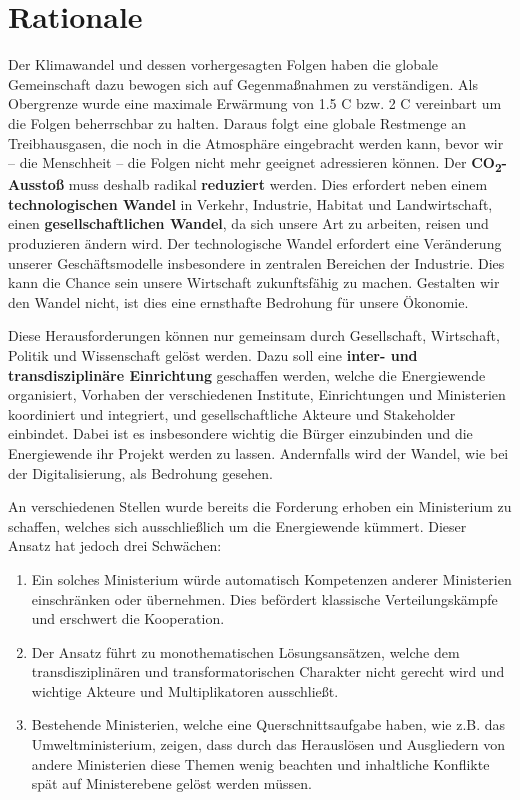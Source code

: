 \section{Rationale}

Der Klimawandel und dessen vorhergesagten Folgen haben die globale Gemeinschaft dazu bewogen sich auf Gegenmaßnahmen zu verständigen. Als Obergrenze wurde eine maximale Erwärmung von 1.5 \degree{}C bzw. 2 \degree{}C vereinbart um die Folgen beherrschbar zu halten.
Daraus folgt eine globale Restmenge an Treibhausgasen, die noch in die Atmosphäre eingebracht werden kann, bevor wir -- die Menschheit -- die Folgen nicht mehr geeignet adressieren können.
%
Der \textbf{CO\textsubscript{2}-Ausstoß} muss deshalb radikal \textbf{reduziert} werden.
Dies erfordert neben einem \textbf{technologischen Wandel} in Verkehr, Industrie, Habitat und Landwirtschaft, einen \textbf{gesellschaftlichen Wandel}, da sich unsere Art zu arbeiten, reisen und produzieren ändern wird.
Der technologische Wandel erfordert eine Veränderung unserer Geschäftsmodelle insbesondere in zentralen Bereichen der Industrie.
Dies kann die Chance sein unsere Wirtschaft zukunftsfähig zu machen.
Gestalten wir den Wandel nicht, ist dies eine ernsthafte Bedrohung für unsere Ökonomie.

Diese Herausforderungen können nur gemeinsam durch Gesellschaft, Wirtschaft, Politik und Wissenschaft gelöst werden.
Dazu soll eine \textbf{inter- und transdisziplinäre Einrichtung} geschaffen werden, welche die Energiewende organisiert, Vorhaben der verschiedenen Institute, Einrichtungen und Ministerien koordiniert und integriert, und gesellschaftliche Akteure und Stakeholder einbindet.
Dabei ist es insbesondere wichtig die Bürger einzubinden und die Energiewende ihr Projekt werden zu lassen.
Andernfalls wird der Wandel, wie bei der Digitalisierung, als Bedrohung gesehen.

An verschiedenen Stellen wurde bereits die Forderung erhoben ein Ministerium zu schaffen, welches sich ausschließlich um die Energiewende kümmert.
Dieser Ansatz hat jedoch drei Schwächen:
\begin{enumerate}
\item Ein solches Ministerium würde automatisch Kompetenzen anderer Ministerien einschränken oder übernehmen. Dies befördert klassische Verteilungskämpfe und erschwert die Kooperation.

\item Der Ansatz führt zu monothematischen Lösungsansätzen, welche dem transdisziplinären und transformatorischen Charakter nicht gerecht wird und wichtige Akteure und Multiplikatoren ausschließt.

\item Bestehende Ministerien, welche eine Querschnittsaufgabe haben, wie z.B. das Umweltministerium, zeigen, dass durch das Herauslösen und Ausgliedern von andere Ministerien diese Themen wenig beachten und inhaltliche Konflikte spät auf Ministerebene gelöst werden müssen.
\end{enumerate}

